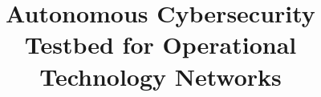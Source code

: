 \documentclass[sigconf]{acmart}
\begin{document}
\title{Autonomous Cybersecurity Testbed for Operational Technology Networks}




\maketitle


% 

\balance






\appendices
\onecolumn
% 
\end{document}

